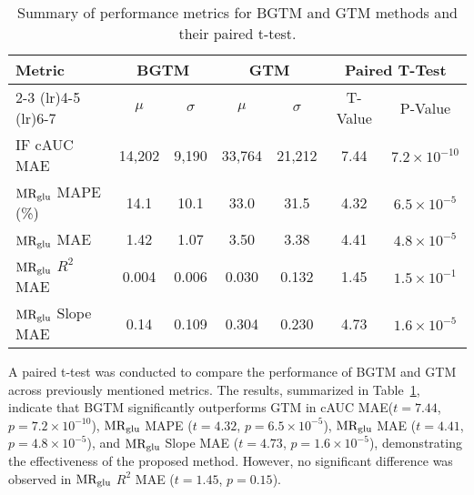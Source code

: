 \begin{table}[b]
	\centering
	\begin{tabular}{l|cc|cc|cc}
		\toprule
		\multirow{3}{*}{\textbf{Metric}} & \multicolumn{2}{c|}{\textbf{BGTM}} & \multicolumn{2}{c}{\textbf{GTM}} & \multicolumn{2}{c}{\textbf{Paired T-Test}}                                                 \\
		\cmidrule(lr){2-3} \cmidrule(lr){4-5} \cmidrule(lr){6-7}
		                                 & \(\mu\)                            & \(\sigma\)                       & \(\mu\)                                    & \(\sigma\) & T-Value & P-Value                \\
		\midrule
		IF cAUC MAE                      & 14,202                             & 9,190                            & 33,764                                     & 21,212     & 7.44    & \(7.2\times 10^{-10}\) \\
		$\text{MR}_{\text{glu}}$ MAPE (\%)               & 14.1                               & 10.1                             & 33.0                                       & 31.5       & 4.32    & \(6.5\times 10^{-5}\)  \\
		$\text{MR}_{\text{glu}}$ MAE                     & 1.42                               & 1.07                             & 3.50                                       & 3.38       & 4.41    & \(4.8\times 10^{-5}\)  \\
		$\text{MR}_{\text{glu}}$ \(R^2\) MAE             & 0.004                              & 0.006                            & 0.030                                      & 0.132      & 1.45    & \(1.5\times 10^{-1}\)  \\
		$\text{MR}_{\text{glu}}$ Slope MAE               & 0.14                               & 0.109                            & 0.304                                      & 0.230      & 4.73    & \(1.6\times 10^{-5}\)  \\
		\bottomrule
	\end{tabular}
	\caption{Summary of performance metrics for BGTM and GTM methods and their paired t-test.
	}
	\label{tab:metrics}
\end{table}

A paired t-test was conducted to compare the performance of BGTM and GTM across previously mentioned metrics.
The results, summarized in Table~\ref{tab:metrics}, indicate that BGTM significantly outperforms GTM in cAUC MAE(\( t = 7.44 \), \( p = 7.2 \times 10^{-10} \)), $\text{MR}_{\text{glu}}$ MAPE (\( t = 4.32 \), \( p = 6.5 \times 10^{-5} \)), $\text{MR}_{\text{glu}}$ MAE (\( t = 4.41 \), \( p = 4.8 \times 10^{-5} \)), and $\text{MR}_{\text{glu}}$ Slope MAE (\( t = 4.73 \), \( p = 1.6 \times 10^{-5} \)), demonstrating the effectiveness of the proposed method.
However, no significant difference was observed in $\text{MR}_{\text{glu}}$ \(R^2\) MAE (\( t = 1.45 \), \( p = 0.15 \)).

